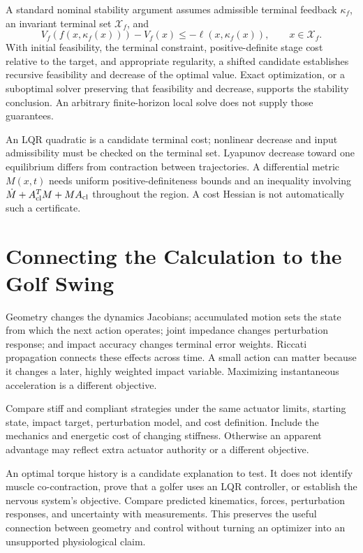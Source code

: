 A standard nominal stability argument assumes admissible terminal feedback
$\kappa_f$, an invariant terminal set $\mathcal X_f$, and
\begin{equation}
V_f(f(x,\kappa_f(x)))-V_f(x)\le-\ell(x,\kappa_f(x)),\qquad x\in\mathcal X_f.
\end{equation}
With initial feasibility, the terminal constraint, positive-definite stage
cost relative to the target, and appropriate regularity, a shifted candidate
establishes recursive feasibility and decrease of the optimal value. Exact
optimization, or a suboptimal solver preserving that feasibility and decrease,
supports the stability conclusion. An arbitrary finite-horizon local solve
does not supply those guarantees.

An LQR quadratic is a candidate terminal cost; nonlinear decrease and input
admissibility must be checked on the terminal set. Lyapunov decrease toward
one equilibrium differs from contraction between trajectories. A differential
metric $M(x,t)$ needs uniform positive-definiteness bounds and an inequality
involving $\dot M+A_{\rm cl}^TM+MA_{\rm cl}$ throughout the region.
A cost Hessian is not automatically such a certificate.

\section{Connecting the Calculation to the Golf Swing}

Geometry changes the dynamics Jacobians; accumulated motion sets the state
from which the next action operates; joint impedance changes perturbation
response; and impact accuracy changes terminal error weights. Riccati
propagation connects these effects across time. A small action can matter
because it changes a later, highly weighted impact variable. Maximizing
instantaneous acceleration is a different objective.

Compare stiff and compliant strategies under the same actuator limits,
starting state, impact target, perturbation model, and cost definition. Include
the mechanics and energetic cost of changing stiffness. Otherwise an apparent
advantage may reflect extra actuator authority or a different objective.

An optimal torque history is a candidate explanation to test. It does not
identify muscle co-contraction, prove that a golfer uses an LQR controller, or
establish the nervous system's objective. Compare predicted kinematics, forces,
perturbation responses, and uncertainty with measurements. This preserves the
useful connection between geometry and control without turning an optimizer
into an unsupported physiological claim.

